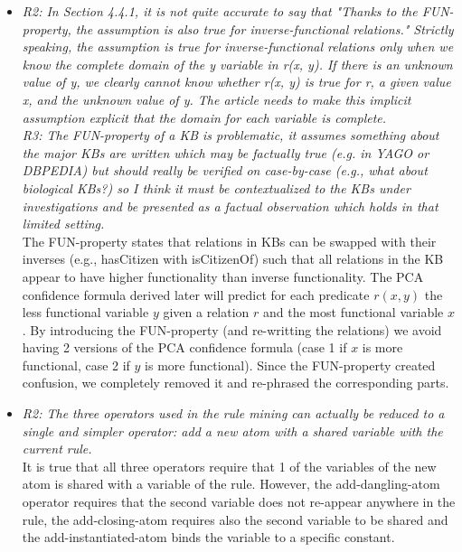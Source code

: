 \begin{figure*}[t!]
\hspace{.1\textwidth}
\begin{minipage}{.8\textwidth}
\large 
     \begin{itemize}
     
      \item \textit{R2: In Section 4.4.1, it is not quite accurate to say that "Thanks to the FUN-property, the assumption is also true for inverse-functional relations." 
      Strictly speaking, the assumption is true for inverse-functional relations only when we know the complete domain of the y variable in r(x, y). 
      If there is an unknown value of y, we clearly cannot know whether r(x, y) is true for r, a given value x, and the unknown value of y. 
      The article needs to make this implicit assumption explicit that the domain for each variable is complete. \\  
      R3: The FUN-property of a KB is problematic, it assumes something about the major KBs are written which may be factually true (e.g. in YAGO or DBPEDIA) 
      but should really be verified on case-by-case (e.g., what about biological KBs?) so I think it must be contextualized to the KBs under investigations and be presented as a 
      factual observation which holds in that limited setting.  \\        
      }
      The FUN-property states that relations in KBs can be swapped with their inverses (e.g., hasCitizen with isCitizenOf) such that all relations in the KB appear to have higher functionality
      than inverse functionality. The PCA confidence formula derived later will predict for each predicate $r(x,y)$ the less functional variable $y$ given a relation $r$ and the most functional variable $x$.
      By introducing the FUN-property (and re-writting the relations) we avoid having 2 versions of the PCA confidence formula (case 1 if $x$ is more functional, case 2 if $y$ is more functional).
      Since the FUN-property created confusion, we completely removed it and re-phrased the corresponding parts. 
      
      \item \textit{R2: The three operators used in the rule mining can actually be reduced to a single and simpler operator: add a new atom with a shared variable with the current rule. \\  }
      It is true that all three operators require that 1 of the variables of the new atom is shared with a variable of the rule. However, the add-dangling-atom operator requires that
      the second variable does not re-appear anywhere in the rule, the add-closing-atom requires also the second variable to be shared and the add-instantiated-atom binds the variable to a specific constant.
      

\end{itemize}
\end{minipage}
\end{figure*}
